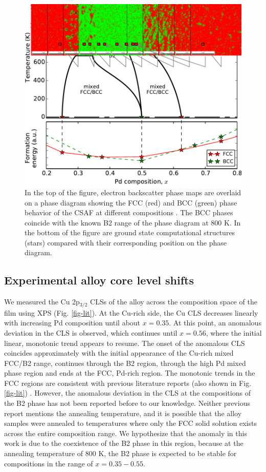 \documentclass[number, sort&compress, review, 12pt]{elsarticle}
\begin{document}
\begin{figure}[H]
\centering
\includegraphics[width=6in]{phase}
\caption{\label{fig-phase}In the top of the figure, electron backscatter phase maps are overlaid on a phase diagram showing the FCC (red) and BCC (green) phase behavior of the CSAF at different compositions \cite{subramanian-1991-cu-pd-pallad}. The BCC phases coincide with the known B2 range of the phase diagram at 800 K. In the bottom of the figure are ground state computational structures (stars) compared with their corresponding position on the phase diagram.}
\end{figure}

\subsection{Experimental alloy core level shifts}
\label{sec-3-2}
We measured the Cu 2p$_{\text{3/2}}$ CLSs of the alloy across the composition space of the film using XPS (Fig. \ref{fig-lit}). At the Cu-rich side, the Cu CLS decreases linearly with increasing Pd composition until about $x = 0.35$. At this point, an anomalous deviation in the CLS is observed, which continues until $x = 0.56$, where the initial linear, monotonic trend appears to resume. The onset of the anomalous CLS coincides approximately with the initial appearance of the Cu-rich  mixed FCC/B2 range, continues through the B2 region, through the high Pd mixed phase region and ends at the FCC, Pd-rich region. The monotonic trends in the FCC regions are consistent with previous literature reports (also shown in Fig. \ref{fig-lit}) \cite{cole-1997-deter-charg,martensson-1981-elect-cu}. However, the anomalous deviation in the CLS at the compositions of the B2 phase has not been reported before to our knowledge. Neither previous report mentions the annealing temperature, and it is possible that the alloy samples were annealed to temperatures where only the FCC solid solution exists across the entire composition range. We hypothesize that the anomaly in this work is due to the coexistence of the B2 phase in this region, because at the annealing temperature of 800 K, the B2 phase is expected to be stable for compositions in the range of $x=0.35-0.55$.
\end{document}
